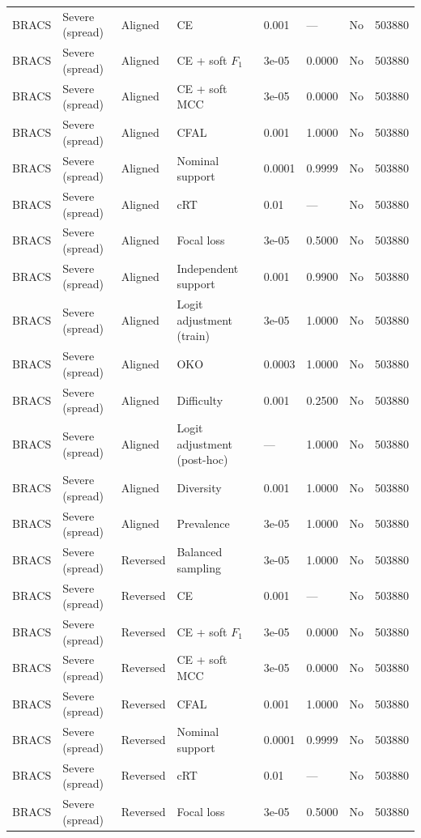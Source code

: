 \begin{longtable}{lllllllr}
BRACS & Severe (spread) & Aligned & CE & 0.001 & --- & No & 503880 \\
BRACS & Severe (spread) & Aligned & CE + soft $F_1$ & 3e-05 & 0.0000 & No & 503880 \\
BRACS & Severe (spread) & Aligned & CE + soft MCC & 3e-05 & 0.0000 & No & 503880 \\
BRACS & Severe (spread) & Aligned & CFAL & 0.001 & 1.0000 & No & 503880 \\
BRACS & Severe (spread) & Aligned & Nominal support & 0.0001 & 0.9999 & No & 503880 \\
BRACS & Severe (spread) & Aligned & cRT & 0.01 & --- & No & 503880 \\
BRACS & Severe (spread) & Aligned & Focal loss & 3e-05 & 0.5000 & No & 503880 \\
BRACS & Severe (spread) & Aligned & Independent support & 0.001 & 0.9900 & No & 503880 \\
BRACS & Severe (spread) & Aligned & Logit adjustment (train) & 3e-05 & 1.0000 & No & 503880 \\
BRACS & Severe (spread) & Aligned & OKO & 0.0003 & 1.0000 & No & 503880 \\
BRACS & Severe (spread) & Aligned & Difficulty & 0.001 & 0.2500 & No & 503880 \\
BRACS & Severe (spread) & Aligned & Logit adjustment (post-hoc) & --- & 1.0000 & No & 503880 \\
BRACS & Severe (spread) & Aligned & Diversity & 0.001 & 1.0000 & No & 503880 \\
BRACS & Severe (spread) & Aligned & Prevalence & 3e-05 & 1.0000 & No & 503880 \\
BRACS & Severe (spread) & Reversed & Balanced sampling & 3e-05 & 1.0000 & No & 503880 \\
BRACS & Severe (spread) & Reversed & CE & 0.001 & --- & No & 503880 \\
BRACS & Severe (spread) & Reversed & CE + soft $F_1$ & 3e-05 & 0.0000 & No & 503880 \\
BRACS & Severe (spread) & Reversed & CE + soft MCC & 3e-05 & 0.0000 & No & 503880 \\
BRACS & Severe (spread) & Reversed & CFAL & 0.001 & 1.0000 & No & 503880 \\
BRACS & Severe (spread) & Reversed & Nominal support & 0.0001 & 0.9999 & No & 503880 \\
BRACS & Severe (spread) & Reversed & cRT & 0.01 & --- & No & 503880 \\
BRACS & Severe (spread) & Reversed & Focal loss & 3e-05 & 0.5000 & No & 503880 \\

\end{longtable}
